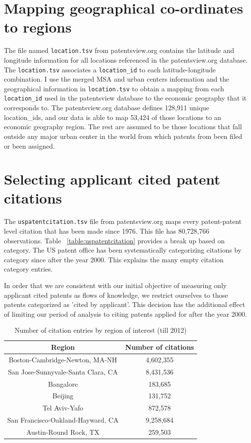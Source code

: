 \documentclass[12pt]{article}
\begin{document}
\section{Mapping geographical co-ordinates to regions}
The file named \verb|location.tsv| from patentsview.org contains the latitude and longitude information for all locations referenced in the patentsview.org database. The \verb|location.tsv| associates a \verb|location_id| to each latitude-longitude combination. I use the merged MSA and urban centers information and the geographical information in \verb|location.tsv| to obtain a mapping from each \verb|location_id| used in the patentsview database to the economic geography that it corresponds to. The patentsview.org database defines 128,911 unique location\_ids, and our data is able to map 53,424 of those locations to an economic geography region. The rest are assumed to be those locations that fall outside any major urban center in the world from which patents from been filed or been assigned.

\section{Selecting applicant cited patent citations}
The \verb|uspatentcitation.tsv| file from patentsview.org maps every patent-patent level citation that has been made since 1976. This file has 80,728,766 observations. Table ~\ref{table:uspatentcitation} provides a break up based on category. The US patent office has been systematically categorizing citations by category since after the year 2000. This explains the many empty citation category entries. 


In order that we are consistent with our initial objective of measuring only applicant cited patents as flows of knowledge, we restrict ourselves to those patents categorized as 'cited by applicant'. This decision has the additional effect of limiting our period of analysis to citing patents applied for after the year 2000. 
\begin{table}
\begin{centering}
\begin{tabular}{|c|c|}
\hline
\textbf{Region}&\textbf{Number of citations}\\\hline
Boston-Cambridge-Newton, MA-NH&4,602,355\\\hline
San Jose-Sunnyvale-Santa Clara, CA&8,431,536\\\hline
Bangalore&183,685\\\hline
Beijing&131,752\\\hline
Tel Aviv-Yafo&872,578\\\hline
San Francisco-Oakland-Hayward, CA&9,258,684\\\hline
Austin-Round Rock, TX&259,503\\\hline
\end{tabular}
\caption {Number of citation entries by region of interest (till 2012)}
\label{table:selected-citations}
\end{centering}
\end{table}
\end{document}
